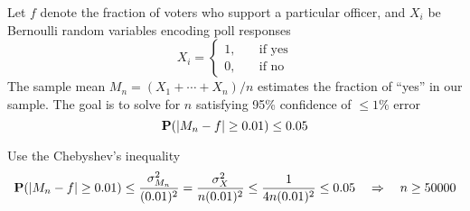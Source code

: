 \documentclass[device=normal, lang=en]{elegantbook}
\numberwithin{equation}{section}
\begin{document}
\begin{example}
    Let $f$ denote the fraction of voters who support a particular officer, and $X_i$ be Bernoulli random variables encoding poll responses
    \begin{equation}
        X_i = \left\{\begin{aligned}
            1, \quad &\text{if yes} \\
            0, \quad &\text{if no}
        \end{aligned}\right.
    \end{equation}
    The sample mean $M_n = (X_1 + \cdots + X_n) / n$ estimates the fraction of ``yes'' in our sample. The goal is to solve for $n$ satisfying 95\% confidence of $\leq 1\%$ error
    \begin{equation}
        \mathbf{P}(\abs{M_n - f} \geq 0.01) \leq 0.05
    \end{equation}
\end{example}
\begin{solution}
    Use the Chebyshev's inequality
    \begin{equation}
        \mathbf{P}(\abs{M_n - f} \geq 0.01) \leq \frac{\sigma_{M_n}^2}{(0.01)^2} = \frac{\sigma_X^2}{n(0.01)^2} \leq \frac{1}{4n(0.01)^2} \leq 0.05 \quad\Rightarrow\quad n \geq 50000
    \end{equation}
\end{solution}

\appendix

\end{document}
